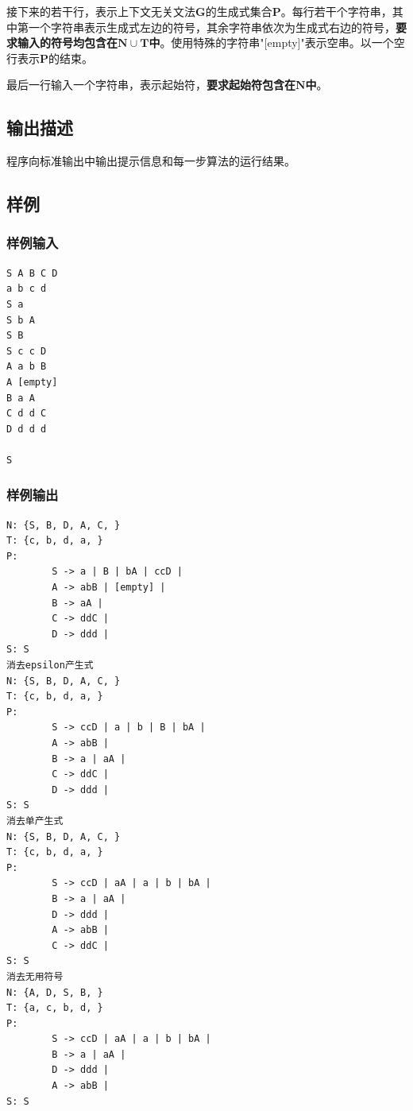 \documentclass[lang=cn,11pt,a4paper,cite=authornum]{paper}
\begin{document}
接下来的若干行，表示上下文无关文法$\mathbf G$的生成式集合$\mathbf P$。每行若干个字符串，其中第一个字符串表示生成式左边的符号，其余字符串依次为生成式右边的符号，\textbf{要求输入的符号均包含在$\mathbf N \cup \mathbf T$中}。使用特殊的字符串"[empty]"表示空串。以一个空行表示$\mathbf P$的结束。

最后一行输入一个字符串，表示起始符，\textbf{要求起始符包含在$\mathbf N$中}。

\subsection{输出描述}

程序向标准输出中输出提示信息和每一步算法的运行结果。

\subsection{样例}

\subsubsection{样例输入}

\begin{code}
\begin{verbatim}
S A B C D
a b c d
S a
S b A
S B
S c c D
A a b B
A [empty]
B a A
C d d C
D d d d

S
\end{verbatim}
\end{code}

\subsubsection{样例输出}

\begin{code}
\begin{verbatim}
N: {S, B, D, A, C, }
T: {c, b, d, a, }
P:
        S -> a | B | bA | ccD | 
        A -> abB | [empty] | 
        B -> aA | 
        C -> ddC | 
        D -> ddd | 
S: S
消去epsilon产生式
N: {S, B, D, A, C, }
T: {c, b, d, a, }
P:
        S -> ccD | a | b | B | bA | 
        A -> abB | 
        B -> a | aA | 
        C -> ddC | 
        D -> ddd | 
S: S
消去单产生式
N: {S, B, D, A, C, }
T: {c, b, d, a, }
P:
        S -> ccD | aA | a | b | bA | 
        B -> a | aA | 
        D -> ddd | 
        A -> abB | 
        C -> ddC | 
S: S
消去无用符号
N: {A, D, S, B, }
T: {a, c, b, d, }
P:
        S -> ccD | aA | a | b | bA | 
        B -> a | aA | 
        D -> ddd | 
        A -> abB | 
S: S
\end{verbatim}
\end{code}
\end{document}
